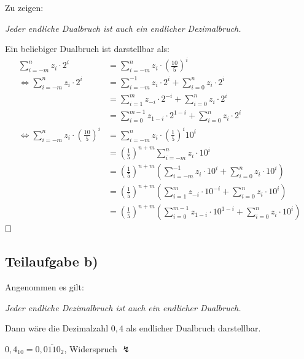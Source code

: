 \documentclass{llncs}
\begin{document}
Zu zeigen: 
\begin{center}
\textit{Jeder endliche Dualbruch ist auch ein endlicher Dezimalbruch.}
\end{center}
Ein beliebiger Dualbruch ist darstellbar als:
\begin{align*}
\sum_{i=-m}^{n} z_{i} \cdot 2^{i} &= \sum_{i=-m}^{n} z_{i} \cdot \left( \frac{10}{5} \right)^{i} \\
\Leftrightarrow \sum_{i=-m}^{n} z_{i} \cdot 2^{i} &= \sum_{i=-m}^{-1} z_{i} \cdot 2^{i} + \sum_{i=0}^{n} z_{i} \cdot 2^{i} \\
                                  &= \sum_{i=1}^{m} z_{-i} \cdot 2^{-i} + \sum_{i=0}^{n} z_{i} \cdot 2^{i} \\
                                  &= \sum_{i=0}^{m-1} z_{1-i} \cdot 2^{1-i} + \sum_{i=0}^{n} z_{i} \cdot 2^{i}\\
\Leftrightarrow \sum_{i=-m}^{n} z_{i} \cdot \left( \frac{10}{5} \right)^{i} &= \sum_{i=-m}^{n} z_{i} \cdot \left(\frac{1}{5}\right)^{i} 10^{i} \\
                                  &= \left(\frac{1}{5}\right)^{n+m} \sum_{i=-m}^{n} z_{i} \cdot 10^{i} \\
                                  &= \left(\frac{1}{5}\right)^{n+m} \left( \sum_{i=-m}^{-1} z_{i} \cdot 10^{i} + \sum_{i=0}^{n} z_{i} \cdot 10^{i} \right) \\
                                  &= \left(\frac{1}{5}\right)^{n+m} \left( \sum_{i=1}^{m} z_{-i} \cdot 10^{-i} + \sum_{i=0}^{n} z_{i} \cdot 10^{i} \right) \\
                                  &= \left(\frac{1}{5}\right)^{n+m} \left( \sum_{i=0}^{m-1} z_{1-i} \cdot 10^{1-i} + \sum_{i=0}^{n} z_{i} \cdot 10^{i} \right)
\end{align*}
$\hfill \square$


\subsection*{Teilaufgabe b)}

Angenommen es gilt:
\begin{center}
\textit{Jeder endliche Dezimalbruch ist auch ein endlicher Dualbruch.}
\end{center}
Dann w\"are die Dezimalzahl $0,4$ als endlicher Dualbruch darstellbar.
\begin{center}
$0,4_{10} = 0,\overline{0110}_2$, Widerspruch $\lightning$
\end{center}
\end{document}
